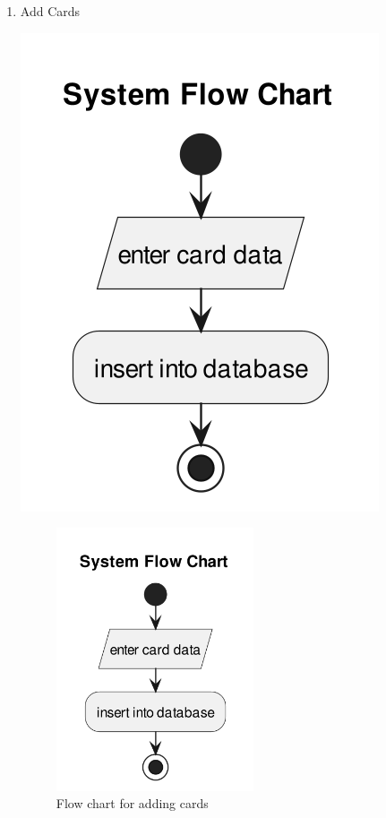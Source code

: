 \documentclass[a4paper]{article}
\begin{document}
\begin{enumerate}
\item Add Cards
\label{sec:org915b992}
\begin{center}
\includegraphics[width=.9\linewidth]{diagrams/add-cards-flow-chart.png}
\end{center}
\begin{figure}[htbp]
\centering
\includegraphics[width=220px]{diagrams/add-cards-flow-chart.png}
\caption{Flow chart for adding cards}
\end{figure}
\FloatBarrier


\end{enumerate}
\end{document}
